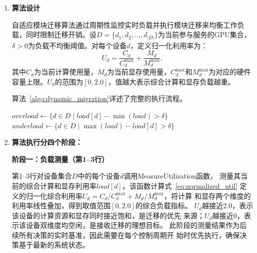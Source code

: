 \begin{enumerate}
  
\item \textbf{算法设计}

自适应模块迁移算法通过周期性监控实时负载并执行模块迁移来均衡工作负载，同时限制迁移开销。设$D = \{d_1, d_2, \ldots, d_{|D|}\}$为当前参与服务的GPU集合，$\delta > 0$为负载不均衡阈值。对每个设备$d$，定义归一化利用率为：
\begin{equation}
    U_d = \frac{C_d}{C^{\max}_d} + \frac{M_d}{M^{\max}_d},
    \label{eq:normalized_util}
\end{equation}
其中$C_d$为当前计算使用量，$M_d$为当前显存使用量，$C^{\max}_d$和$M^{\max}_d$为对应的硬件容量上限。$U_d$的范围为$[0, 2.0]$，值越大表示综合计算和显存负载越重。

算法~\ref{algo:dynamic_migration}详述了完整的执行流程。

\begin{algorithm}[htbp]
    \caption{自适应模块迁移算法}
    \label{algo:dynamic_migration}
    \BlankLine
    $overload \leftarrow \{d \in D \mid load[d] - \min(load) > \delta\}$\;
    $underload \leftarrow \{d \in D \mid \max(load) - load[d] > \delta\}$\;
    \BlankLine
    \;
\end{algorithm}

\item \textbf{算法执行分四个阶段：}

\textbf{阶段一：负载测量（第1--3行）}

第1--3行对设备集合$D$中的每个设备$d$调用MeasureUtilization函数，
测量其当前的综合计算和显存利用率$load[d]$。该函数计算式~\eqref{eq:normalized_util}
定义的归一化综合利用率$U_d = C_d/C^{\max}_d + M_d/M^{\max}_d$，将计算
和显存两个维度的利用率线性叠加，得到取值范围$[0,2.0]$的综合负载指标。
$U_d$越接近2.0，表示该设备的计算资源和显存同时接近饱和，是迁移的优先
来源；$U_d$越接近0，表示该设备双维度均空闲，是接收迁移的理想目标。
此阶段的测量结果作为后续所有决策的实时基准，因此需要在每个控制周期开
始时优先执行，确保决策基于最新的系统状态。


\end{enumerate}

